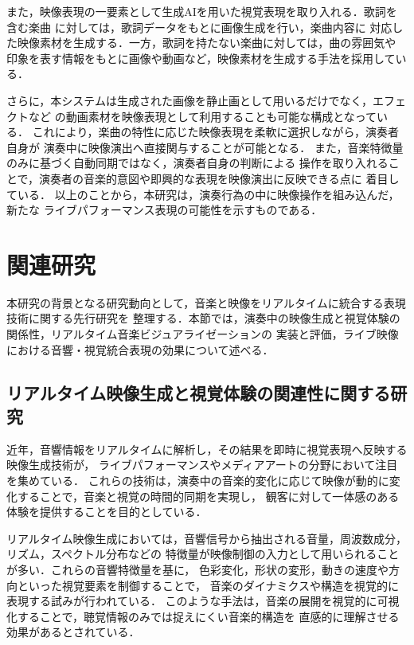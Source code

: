 また，映像表現の一要素として生成AIを用いた視覚表現を取り入れる．歌詞を含む楽曲
に対しては，歌詞データをもとに画像生成を行い，楽曲内容に
対応した映像素材を生成する．一方，歌詞を持たない楽曲に対しては，曲の雰囲気や
印象を表す情報をもとに画像や動画など，映像素材を生成する手法を採用している．

さらに，本システムは生成された画像を静止画として用いるだけでなく，エフェクトなど
の動画素材を映像表現として利用することも可能な構成となっている．
これにより，楽曲の特性に応じた映像表現を柔軟に選択しながら，演奏者自身が
演奏中に映像演出へ直接関与することが可能となる．
また，音楽特徴量のみに基づく自動同期ではなく，演奏者自身の判断による
操作を取り入れることで，演奏者の音楽的意図や即興的な表現を映像演出に反映できる点に
着目している．
以上のことから，本研究は，演奏行為の中に映像操作を組み込んだ，新たな
ライブパフォーマンス表現の可能性を示すものである．

\section{関連研究}

本研究の背景となる研究動向として，音楽と映像をリアルタイムに統合する表現技術に関する先行研究を
整理する．本節では，演奏中の映像生成と視覚体験の関係性，リアルタイム音楽ビジュアライゼーションの
実装と評価，ライブ映像における音響・視覚統合表現の効果について述べる．

\subsection{リアルタイム映像生成と視覚体験の関連性に関する研究}
近年，音響情報をリアルタイムに解析し，その結果を即時に視覚表現へ反映する映像生成技術が，
ライブパフォーマンスやメディアアートの分野において注目を集めている．
これらの技術は，演奏中の音楽的変化に応じて映像が動的に変化することで，音楽と視覚の時間的同期を実現し，
観客に対して一体感のある体験を提供することを目的としている．

リアルタイム映像生成においては，音響信号から抽出される音量，周波数成分，リズム，スペクトル分布などの
特徴量が映像制御の入力として用いられることが多い．これらの音響特徴量を基に，
色彩変化，形状の変形，動きの速度や方向といった視覚要素を制御することで，
音楽のダイナミクスや構造を視覚的に表現する試みが行われている．
このような手法は，音楽の展開を視覚的に可視化することで，聴覚情報のみでは捉えにくい音楽的構造を
直感的に理解させる効果があるとされている．

